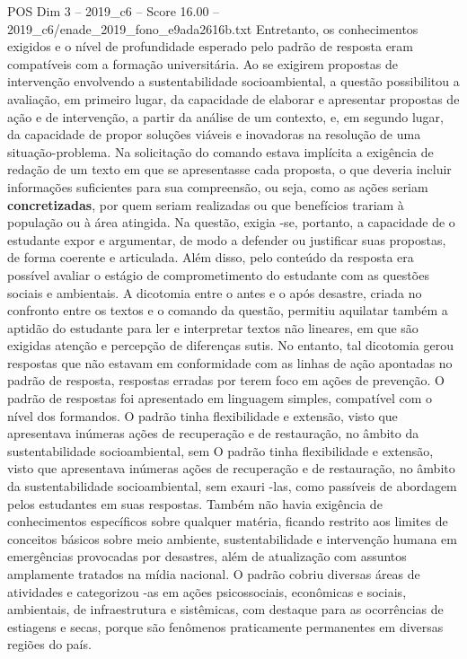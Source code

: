\begin{textsample}{POS Dim 3 – 2019\_c6 – Score 16.00 – 2019\_c6/enade\_2019\_fono\_e9ada2616b.txt}
Entretanto, os conhecimentos exigidos e o nível de profundidade esperado pelo padrão de resposta eram compatíveis com a formação universitária.
Ao se exigirem propostas de intervenção envolvendo a sustentabilidade socioambiental, a questão possibilitou a avaliação, em primeiro lugar, da capacidade de elaborar e apresentar propostas de ação e de intervenção, a partir da análise de um contexto, e, em segundo lugar, da capacidade de propor soluções viáveis e inovadoras na resolução de uma situação-problema.
Na solicitação do comando estava implícita a exigência de redação de um texto em que se apresentasse cada proposta, o que deveria incluir informações suficientes para sua compreensão, ou seja, como as ações seriam \textbf{concretizadas}, por quem seriam realizadas ou que benefícios trariam à população ou à área atingida.
Na questão, exigia -se, portanto, a capacidade de o estudante expor e argumentar, de modo a defender ou justificar suas propostas, de forma coerente e articulada.
Além disso, pelo conteúdo da resposta era possível avaliar o estágio de comprometimento do estudante com as questões sociais e ambientais.
A dicotomia entre o antes e o após desastre, criada no confronto entre os textos e o comando da questão, permitiu aquilatar também a aptidão do estudante para ler e interpretar textos não lineares, em que são exigidas atenção e percepção de diferenças sutis.
No entanto, tal dicotomia gerou respostas que não estavam em conformidade com as linhas de ação apontadas no padrão de resposta, respostas erradas por terem foco em ações de prevenção.
O padrão de respostas foi apresentado em linguagem simples, compatível com o nível dos formandos.
O padrão tinha flexibilidade e extensão, visto que apresentava inúmeras ações de recuperação e de restauração, no âmbito da sustentabilidade socioambiental, sem O padrão tinha flexibilidade e extensão, visto que apresentava inúmeras ações de recuperação e de restauração, no âmbito da sustentabilidade socioambiental, sem exauri -las, como passíveis de abordagem pelos estudantes em suas respostas.
Também não havia exigência de conhecimentos específicos sobre qualquer matéria, ficando restrito aos limites de conceitos básicos sobre meio ambiente, sustentabilidade e intervenção humana em emergências provocadas por desastres, além de atualização com assuntos amplamente tratados na mídia nacional.
O padrão cobriu diversas áreas de atividades e categorizou -as em ações psicossociais, econômicas e sociais, ambientais, de infraestrutura e sistêmicas, com destaque para as ocorrências de estiagens e secas, porque são fenômenos praticamente permanentes em diversas regiões do país.

\end{textsample}
